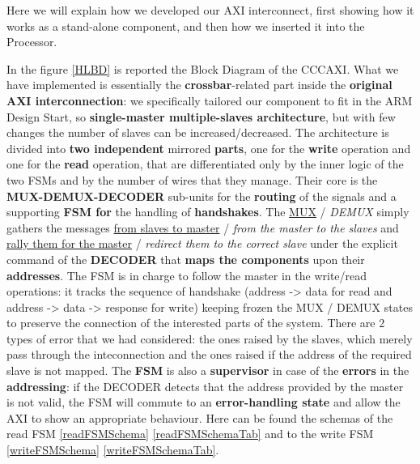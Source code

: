 Here we will explain how we developed our AXI interconnect, first showing how it works as a stand-alone component, and then how we inserted it into the Processor.
\newline

{}
In the figure \ref{HLBD} is reported the Block Diagram of the CCCAXI.
\newline
What we have implemented is essentially the {\bf crossbar}-related part inside the {\bf original AXI interconnection}: we specifically tailored our component to fit in the ARM Design Start, so {\bf single-master multiple-slaves architecture}, but with few changes the number of slaves can be increased/decreased.
\newline
The architecture is divided into {\bf two independent} mirrored {\bf parts}, one for the {\bf write} operation and one for the {\bf read} operation, that are differentiated only by the inner logic of the two FSMs and by the number of wires that they manage. Their core is the {\bf MUX-DEMUX-DECODER} sub-units for the {\bf routing} of the signals and a supporting {\bf FSM for} the handling of {\bf handshakes}.
\newline
The \underline{MUX} / {\it DEMUX} simply gathers the messages \underline{from slaves to master} / {\it from the master to the slaves} and \underline{rally them for the master} / {\it redirect them to the correct slave} under the explicit command of the {\bf DECODER} that {\bf maps the components} upon their {\bf addresses}.
\newline
The FSM is in charge to follow the master in the write/read operations: it tracks the sequence of handshake (address -> data for read and address -> data -> response for write) keeping frozen the MUX / DEMUX states to preserve the connection of the interested parts of the system.
\newline
There are 2 types of error that we had considered: the ones raised by the slaves, which merely pass through the inteconnection and the ones raised if the address of the required slave is not mapped. The {\bf FSM} is also a {\bf supervisor} in case of the {\bf errors} in the {\bf addressing}: if the DECODER detects that the address provided by the master is not valid, the FSM will commute to an {\bf error-handling state} and allow the AXI to show an appropriate behaviour.
\newline
Here can be found the schemas of the read FSM \ref{readFSMSchema} \ref{readFSMSchemaTab} and to the write FSM \ref{writeFSMSchema} \ref{writeFSMSchemaTab}.
\newline

